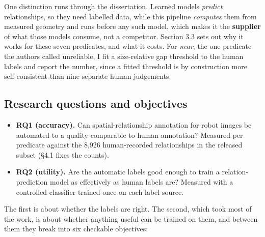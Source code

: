 One distinction runs through the dissertation. Learned models \textit{predict} relationships, so they need labelled data, while this pipeline \textit{computes} them from measured geometry and runs before any such model, which makes it the \textbf{supplier} of what those models consume, not a competitor. Section 3.3 sets out why it works for these seven predicates, and what it costs. For \textit{near}, the one predicate the authors called unreliable, I fit a size-relative gap threshold to the human labels and report the number, since a fitted threshold is by construction more self-consistent than nine separate human judgements.

\subsection{Research questions and objectives}

\begin{itemize}
\item \textbf{RQ1 (accuracy).} Can spatial-relationship annotation for robot images be automated to a quality comparable to human annotation? Measured per predicate against the 8,926 human-recorded relationships in the released subset (\S{}4.1 fixes the counts).
\item \textbf{RQ2 (utility).} Are the automatic labels good enough to train a relation-prediction model as effectively as human labels are? Measured with a controlled classifier trained once on each label source.
\end{itemize}

The first is about whether the labels are right. The second, which took most of the work, is about whether anything useful can be trained on them, and between them they break into six checkable objectives:

